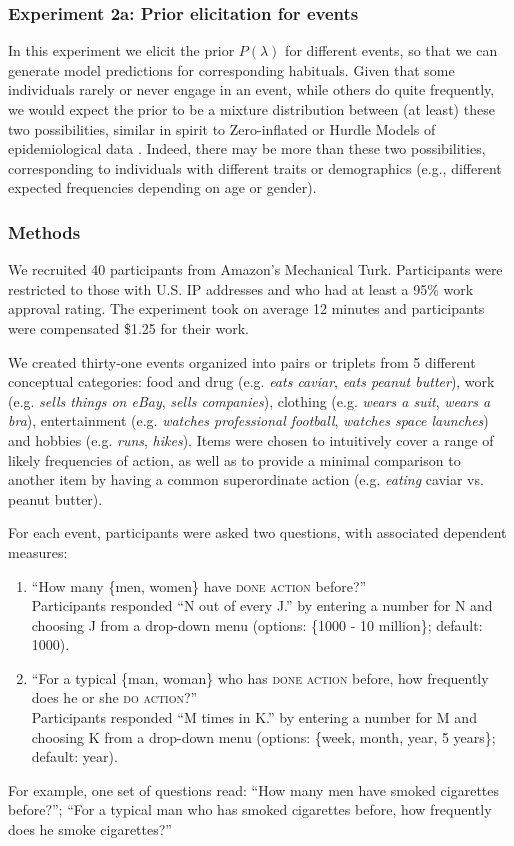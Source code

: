 \documentclass[11pt,letterpaper]{article}
\begin{document}
\subsubsection*{Experiment 2a: Prior elicitation for events}

In this experiment we elicit the prior $P(\lambda)$ for different events, so that we can generate model predictions for corresponding habituals.
Given that some individuals rarely or never engage in an event, while others do quite frequently, we would expect the prior to be a mixture distribution between (at least) these two possibilities, similar in spirit to Zero-inflated or Hurdle Models of epidemiological data \cite{hurdleModels}.
Indeed, there may be more than these two possibilities, corresponding to individuals with different traits or demographics (e.g., different expected frequencies depending on age or gender). 

\subsubsection*{Methods}

We recruited 40 participants from Amazon's Mechanical Turk.
Participants were restricted to those with U.S. IP addresses and who had at least a 95\% work approval rating.
The experiment took on average 12 minutes and participants were compensated \$1.25 for their work.

We created thirty-one events organized into pairs or triplets from 5 different conceptual categories: food and drug (e.g. \emph{eats caviar}, \emph{eats peanut butter}), work (e.g. \emph{sells things on eBay}, \emph{sells companies}), clothing (e.g. \emph{wears a suit}, \emph{wears a bra}), entertainment (e.g. \emph{watches professional football}, \emph{watches space launches}) and hobbies (e.g. \emph{runs}, \emph{hikes}). 
Items were chosen to intuitively cover a range of likely frequencies of action, as well as to provide a minimal comparison to another item by having a common superordinate action (e.g. \emph{eating} caviar vs. peanut butter).

For each event, participants were asked two questions, with associated dependent measures:
\begin{enumerate}
\itemsep0em%
\item ``How many \{men, women\} have \textsc{done action} before?'' \\
Participants responded ``N out of every J.'' by entering a number for N and choosing J from a drop-down menu (options: \{1000 - 10 million\}; default: 1000).
\item ``For a typical \{man, woman\} who has \textsc{done action}  before, how frequently does he or she \textsc{do action}?''\\  
Participants responded ``M times in K.'' by entering a number for M and choosing K from a drop-down menu (options: \{week, month, year, 5 years\}; default: year).
\end{enumerate}
For example, one set of questions read: ``How many men have smoked cigarettes before?''; ``For a typical man who has smoked cigarettes before, how frequently does he smoke cigarettes?''
\end{document}
